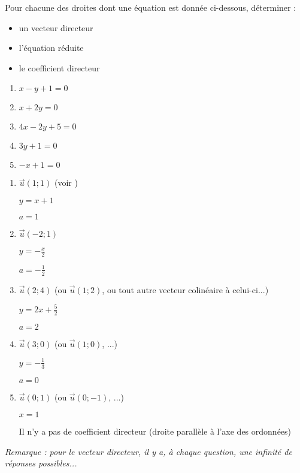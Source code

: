 
Pour chacune des droites dont une équation est donnée ci-dessous, déterminer :
\begin{itemize}
     \item un vecteur directeur
     \item l'équation réduite
     \item le coefficient directeur
\end{itemize}
\begin{enumerate}\item $x-y+1=0$
     \item $x+2y=0$
     \item $4x-2y+5=0$
     \item $3y+1=0$
     \item $-x+1=0$
\end{enumerate}
\begin{corrige}
     \begin{enumerate}
          \item   $\vec{u}\left(1 ; 1\right)  $  (voir )
          \par
          $y = x+1$
          \par
          $a=1$
          \item   $\vec{u}\left(-2 ; 1\right)$
          \par
          $y = -\frac{x}{2}$
          \par
          $a=-\frac{1}{2}$
          \item   $\vec{u}\left(2 ; 4\right)  $ (ou $\vec{u}\left(1 ; 2\right)$, ou tout autre vecteur colinéaire à celui-ci...)
          \par
          $y = 2x+\frac{5}{2}$
          \par
          $a=2$
          \item   $\vec{u}\left(3 ; 0\right)  $ (ou $\vec{u}\left(1 ; 0\right)$, ...)
          \par
          $y = -\frac{1}{3}$
          \par
          $a=0$
          \item   $\vec{u}\left(0 ; 1\right)$ (ou $\vec{u}\left( 0 ; -1 \right)$, ...)
          \par
          $x = 1$
          \par
          Il n'y a pas de coefficient directeur (droite parallèle à l'axe des ordonnées)
     \end{enumerate}
     \textit{Remarque : pour le vecteur directeur, il y a, à chaque question,  une infinité de réponses possibles...}
\end{corrige}
